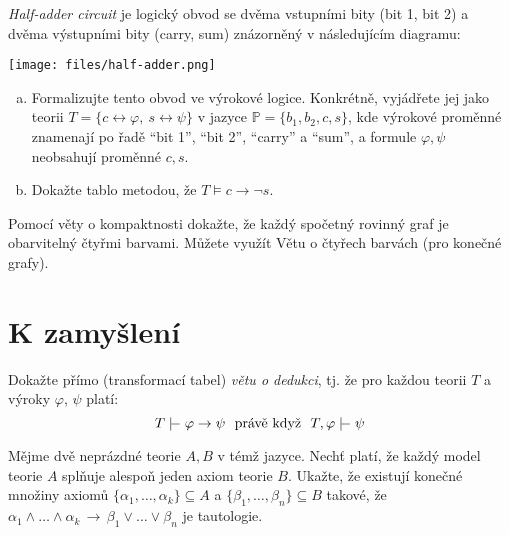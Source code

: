 \begin{problem}

    \emph{Half-adder circuit} je logický obvod se dvěma vstupními bity (bit 1, bit 2) a dvěma výstupními bity (carry, sum) znázorněný v následujícím diagramu:
    \begin{center}
        \texttt{[image: files/half-adder.png]}
    \end{center}
    \begin{enumerate}[(a)]
            \item Formalizujte tento obvod ve výrokové logice. Konkrétně, vyjádřete jej jako teorii $T=\{c\leftrightarrow \varphi,\ s\leftrightarrow \psi\}$ v jazyce $\mathbb P=\{b_1,b_2,c,s\}$, kde výrokové proměnné znamenají po řadě ``bit 1'', ``bit 2'', ``carry'' a ``sum'', a formule $\varphi,\psi$ neobsahují proměnné $c,s$.
            \item Dokažte tablo metodou, že $T\models c\to\neg s$.
    \end{enumerate}

\end{problem}


\begin{problem}

    Pomocí věty o kompaktnosti dokažte, že každý spočetný rovinný graf je obarvitelný čtyřmi barvami. Můžete využít Větu o čtyřech barvách (pro konečné grafy).

\end{problem}

        
\section*{K zamyšlení}
        
        
\begin{problem}

    Dokažte přímo (transformací tabel) \emph{větu o dedukci}, tj. že pro každou teorii $T$ a výroky $\varphi$, $\psi$ platí:
    $$
    T \proves \varphi\to\psi\text{\ \ právě když\ \ }T,\varphi\proves  \psi
    $$

\end{problem}


\begin{problem}
    Mějme dvě neprázdné teorie $A, B$ v témž jazyce. Nechť platí, že každý model teorie $A$ splňuje alespoň jeden axiom teorie $B$. Ukažte, že existují konečné množiny axiomů $\{\alpha_1,\dots,\alpha_k\}\subseteq A$ a $\{\beta_1,\dots,\beta_n\}\subseteq B$ takové, že $\alpha_1\wedge\dots\wedge\alpha_k\,\to\,\beta_1\vee\dots\vee\beta_n$ je tautologie.
\end{problem}
